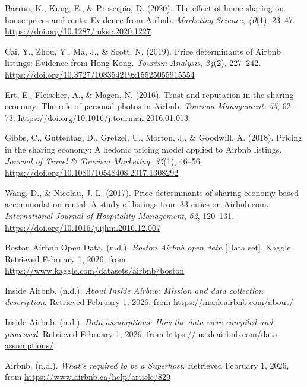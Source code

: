 \documentclass[
]{article}
\begin{document}
Barron, K., Kung, E., \& Proserpio, D. (2020). The effect of
home-sharing on house prices and rents: Evidence from Airbnb.
\emph{Marketing Science}, \emph{40}(1), 23--47.
\url{https://doi.org/10.1287/mksc.2020.1227}

Cai, Y., Zhou, Y., Ma, J., \& Scott, N. (2019). Price determinants of
Airbnb listings: Evidence from Hong Kong. \emph{Tourism Analysis},
\emph{24}(2), 227--242.
\url{https://doi.org/10.3727/108354219x15525055915554}

Ert, E., Fleischer, A., \& Magen, N. (2016). Trust and reputation in the
sharing economy: The role of personal photos in Airbnb. \emph{Tourism
Management}, \emph{55}, 62--73.
\url{https://doi.org/10.1016/j.tourman.2016.01.013}

Gibbs, C., Guttentag, D., Gretzel, U., Morton, J., \& Goodwill, A.
(2018). Pricing in the sharing economy: A hedonic pricing model applied
to Airbnb listings. \emph{Journal of Travel \& Tourism Marketing},
\emph{35}(1), 46--56.
\url{https://doi.org/10.1080/10548408.2017.1308292}

Wang, D., \& Nicolau, J. L. (2017). Price determinants of sharing
economy based accommodation rental: A study of listings from 33 cities
on Airbnb.com. \emph{International Journal of Hospitality Management},
\emph{62}, 120--131. \url{https://doi.org/10.1016/j.ijhm.2016.12.007}

Boston Airbnb Open Data. (n.d.). \emph{Boston Airbnb open data} {[}Data
set{]}. Kaggle. Retrieved February 1, 2026, from
\url{https://www.kaggle.com/datasets/airbnb/boston}

Inside Airbnb. (n.d.). \emph{About Inside Airbnb: Mission and data
collection description}. Retrieved February 1, 2026, from
\url{https://insideairbnb.com/about/}

Inside Airbnb. (n.d.). \emph{Data assumptions: How the data were
compiled and processed}. Retrieved February 1, 2026, from
\url{https://insideairbnb.com/data-assumptions/}

Airbnb. (n.d.). \emph{What's required to be a Superhost}. Retrieved
February 1, 2026, from \url{https://www.airbnb.ca/help/article/829}
\end{document}
